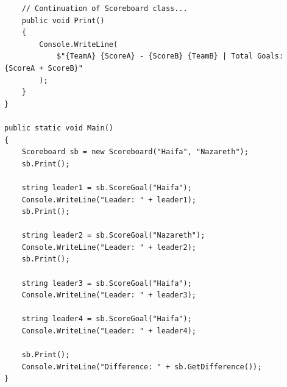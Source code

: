 \documentclass[14pt]{extarticle}
\begin{document}
\begin{enumerate}[itemsep=2em]
{\begin{boxSolution}
\begin{english}
\begin{verbatim}
    // Continuation of Scoreboard class...
    public void Print()
    {
        Console.WriteLine(
            $"{TeamA} {ScoreA} - {ScoreB} {TeamB} | Total Goals: {ScoreA + ScoreB}"
        );
    }
}

public static void Main()
{
    Scoreboard sb = new Scoreboard("Haifa", "Nazareth");
    sb.Print();

    string leader1 = sb.ScoreGoal("Haifa");
    Console.WriteLine("Leader: " + leader1);
    sb.Print();

    string leader2 = sb.ScoreGoal("Nazareth");
    Console.WriteLine("Leader: " + leader2);
    sb.Print();

    string leader3 = sb.ScoreGoal("Haifa");
    Console.WriteLine("Leader: " + leader3);

    string leader4 = sb.ScoreGoal("Haifa");
    Console.WriteLine("Leader: " + leader4);

    sb.Print();
    Console.WriteLine("Difference: " + sb.GetDifference());
}
\end{verbatim}
\end{english}
\end{boxSolution}
}
\fi
\clearpage






\end{enumerate}
\end{document}

